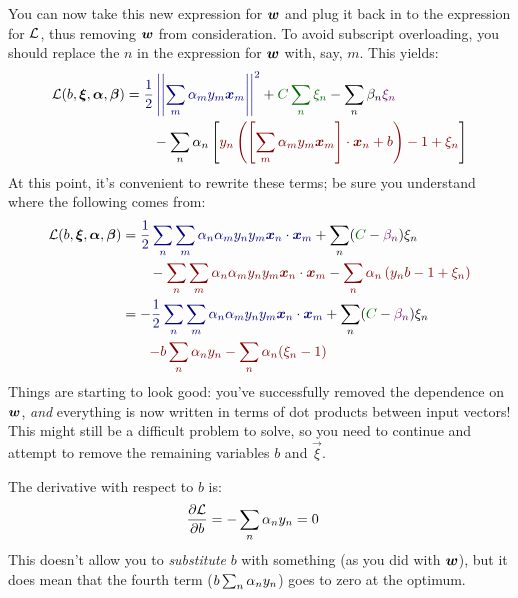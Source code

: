 You can now take this new expression for ${\boldsymbol{w}}$ and plug it back in to
the expression for $\mathcal{L}$, thus removing ${\boldsymbol{w}}$ from consideration.  To
avoid subscript overloading, you should replace the $n$ in the
expression for ${\boldsymbol{w}}$ with, say, $m$.  This yields:
%
\begin{align}
\cL(b,\vec\xi,\vec\al,\vec\be)
&= 
  \textcolor{darkblue}{\frac 1 2 \norm{\sum_m \al_m y_m \vx_m}^2}
+ \textcolor{darkergreen}{C \sum_n \xi_n}
- \sum_n \be_n \textcolor{darkpurple}{\xi_n}
\\&\qquad
- \sum_n \al_n \left[
    \textcolor{darkred}{y_n \left( \dotp{\left[ \sum_m \al_m y_m \vx_m\right]}{\vx_n} + b \right) - 1 + \xi_n}
  \right]
\end{align}
%
At this point, it's convenient to rewrite these terms; be sure you
understand where the following comes from:
%
\begin{align}
\cL(b,\vec\xi,\vec\al,\vec\be)
&= 
  \textcolor{darkblue}{\frac 1 2
    \sum_n \sum_m \al_n \al_m y_n y_m \dotp{\vx_n}{\vx_m}
  }
+ \sum_n (\textcolor{darkergreen}{C} - \textcolor{darkpurple}{\be_n}) \xi_n
\\&\qquad
   - \textcolor{darkred}{
    \sum_n
    \sum_m 
      \al_n \al_m y_n y_m \dotp{\vx_n}{\vx_m}
}
- \textcolor{darkred}{
  \sum_n \al_n \left( y_n b - 1 + \xi_n \right)}\\
&=
-   \textcolor{darkblue}{\frac 1 2
    \sum_n \sum_m \al_n \al_m y_n y_m \dotp{\vx_n}{\vx_m}
  }
+ \sum_n (\textcolor{darkergreen}{C} - \textcolor{darkpurple}{\be_n}) \xi_n
\\&\qquad
\textcolor{darkred}{
-  b \sum_n \al_n y_n 
-  \sum_n \al_n (\xi_n - 1)}
\end{align}
%
Things are starting to look good: you've successfully removed the
dependence on ${\boldsymbol{w}}$, \emph{and} everything is now written in terms of
dot products between input vectors!  This might still be a difficult
problem to solve, so you need to continue and attempt to remove the
remaining variables $b$ and $\vec \xi$.

The derivative with respect to $b$ is:
%
\begin{align}
\frac {\partial \mathcal{L}} {\partial b}
&= - \sum_n \alpha_n y_n = 0
\end{align}
%
This doesn't allow you to \emph{substitute} $b$ with something (as you
did with ${\boldsymbol{w}}$), but it does mean that the fourth term ($b \sum_n
\alpha_n y_n$) goes to zero at the optimum.

